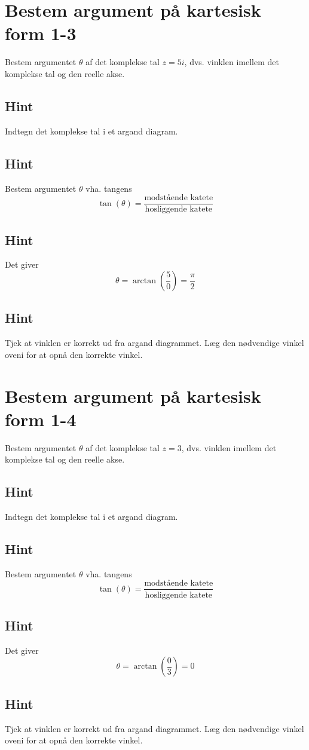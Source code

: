 \documentclass{article}
\newenvironment{exercise}[1]{\newpage\section{#1}}{}
\newcommand{\answerbox}[1]{\fbox{$#1$}}
\newcommand{\hint}{\subsection*{Hint}}
\begin{document}
\newpage

\begin{exercise}{Bestem argument på kartesisk form 1-3}
	
	Bestem argumentet $\theta$ af det komplekse tal $z=5i$, dvs. vinklen imellem det komplekse tal og den reelle akse.
	
	\answerbox{ \frac{\pi}{2}}
	
	
	\hint 
	
	Indtegn det komplekse tal i et argand diagram.
	
	
	\hint
	
	Bestem argumentet $\theta$ vha. tangens
	\[
	\tan(\theta)=\frac{\textrm{modstående katete}}{\textrm{hosliggende katete}}
	\]
	
	\hint 
	
	Det giver
	\[
	\theta = \arctan \left(\frac{5}{0}\right) = \frac{\pi}{2}
	\]
	
	\hint
	
	Tjek at vinklen er korrekt ud fra argand diagrammet. Læg den nødvendige vinkel oveni for at opnå den korrekte vinkel. 
	
	
\end{exercise}

\newpage

\begin{exercise}{Bestem argument på kartesisk form 1-4}
	
	Bestem argumentet $\theta$ af det komplekse tal $z=3$, dvs. vinklen imellem det komplekse tal og den reelle akse.
	
	\answerbox{0}
	
	
	\hint 
	
	Indtegn det komplekse tal i et argand diagram.
	
	
	\hint
	
	Bestem argumentet $\theta$ vha. tangens
	\[
	\tan(\theta)=\frac{\textrm{modstående katete}}{\textrm{hosliggende katete}}
	\]
	
	\hint 
	
	Det giver
	\[
	\theta = \arctan \left(\frac{0}{3}\right) = 0
	\]
	
	\hint
	
	Tjek at vinklen er korrekt ud fra argand diagrammet. Læg den nødvendige vinkel oveni for at opnå den korrekte vinkel. 
	
	
\end{exercise}

\newpage
\end{document}
